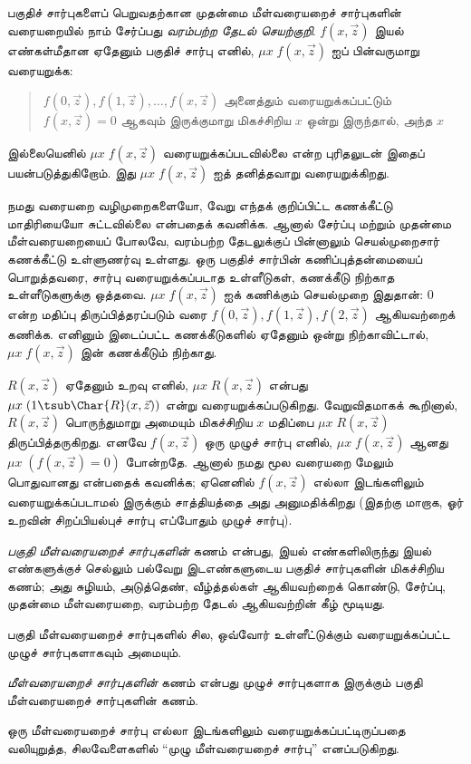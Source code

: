 \documentclass[../../../include/open-logic-section]{subfiles}
\begin{document}
பகுதிச் சார்புகளைப் பெறுவதற்கான முதன்மை மீள்வரையறைச் சார்புகளின்
வரையறையில் நாம் சேர்ப்பது \emph{வரம்பற்ற தேடல் செயற்குறி}.
$f(x,\vec z)$ இயல் எண்கள்மீதான ஏதேனும் பகுதிச் சார்பு எனில்,
$\mu x \; f(x,\vec z)$ ஐப் பின்வருமாறு வரையறுக்க:
\begin{quote}
  $f(0,\vec z), f(1,\vec z), \dots, f(x,\vec z)$ அனைத்தும்
  வரையறுக்கப்பட்டும் $f(x,\vec z) = 0$ ஆகவும் இருக்குமாறு
  மிகச்சிறிய $x$ ஒன்று இருந்தால், அந்த $x$
\end{quote}
இல்லையெனில் $\mu x \; f(x,\vec z)$ வரையறுக்கப்படவில்லை என்ற
புரிதலுடன் இதைப் பயன்படுத்துகிறோம். இது $\mu x \; f(x,\vec z)$ ஐத்
தனித்தவாறு வரையறுக்கிறது.

\begin{explain}
நமது வரையறை வழிமுறைகளையோ,
வேறு எந்தக் குறிப்பிட்ட கணக்கீட்டு மாதிரியையோ சுட்டவில்லை என்பதைக்
கவனிக்க. ஆனால் சேர்ப்பு மற்றும் முதன்மை மீள்வரையறையைப் போலவே,
வரம்பற்ற தேடலுக்குப் பின்னாலும் செயல்முறைசார் கணக்கீட்டு உள்ளுணர்வு
உள்ளது. ஒரு பகுதிச் சார்பின் கணிப்புத்தன்மையைப் பொறுத்தவரை, சார்பு
வரையறுக்கப்படாத உள்ளீடுகள், கணக்கீடு நிற்காத உள்ளீடுகளுக்கு ஒத்தவை.
$\mu x \; f(x,\vec z)$ ஐக் கணிக்கும் செயல்முறை இதுதான்:
0 என்ற மதிப்பு திருப்பித்தரப்படும் வரை $f(0,\vec z), f(1,\vec z),
f(2,\vec z)$ ஆகியவற்றைக் கணிக்க. எனினும் இடைப்பட்ட கணக்கீடுகளில்
ஏதேனும் ஒன்று நிற்காவிட்டால், $\mu x \; f(x,\vec z)$ இன் கணக்கீடும்
நிற்காது.
\end{explain}

$R(x,\vec z)$ ஏதேனும் உறவு எனில், $\mu x \; R(x,\vec z)$ என்பது
$\mu x \; (1 \tsub \Char{R}(x,\vec z))$ என்று வரையறுக்கப்படுகிறது.
வேறுவிதமாகக் கூறினால், $R(x,\vec z)$ பொருந்துமாறு அமையும் மிகச்சிறிய
$x$ மதிப்பை $\mu x \; R(x,\vec z)$ திருப்பித்தருகிறது. எனவே
$f(x,\vec z)$ ஒரு முழுச் சார்பு எனில், $\mu x \; f(x,\vec z)$ ஆனது
$\mu x \; (f(x,\vec z) = 0)$ போன்றதே. ஆனால் நமது மூல வரையறை
மேலும் பொதுவானது என்பதைக் கவனிக்க; ஏனெனில் $f(x,\vec z)$ எல்லா
இடங்களிலும் வரையறுக்கப்படாமல் இருக்கும் சாத்தியத்தை அது அனுமதிக்கிறது
(இதற்கு மாறாக, ஓர் உறவின் சிறப்பியல்புச் சார்பு எப்போதும் முழுச் சார்பு).

\begin{defn}
\emph{பகுதி மீள்வரையறைச் சார்புகளின்} கணம் என்பது, இயல்
எண்களிலிருந்து இயல் எண்களுக்குச் செல்லும் பல்வேறு இடஎண்களுடைய
பகுதிச் சார்புகளின் மிகச்சிறிய கணம்; அது சுழியம், அடுத்தெண்,
வீழ்த்தல்கள் ஆகியவற்றைக் கொண்டு, சேர்ப்பு, முதன்மை மீள்வரையறை,
வரம்பற்ற தேடல் ஆகியவற்றின் கீழ் மூடியது.
\end{defn}

பகுதி மீள்வரையறைச் சார்புகளில் சில, ஒவ்வோர் உள்ளீட்டுக்கும்
வரையறுக்கப்பட்ட முழுச் சார்புகளாகவும் அமையும்.

\begin{defn}
\emph{மீள்வரையறைச் சார்புகளின்} கணம் என்பது முழுச் சார்புகளாக
இருக்கும் பகுதி மீள்வரையறைச் சார்புகளின் கணம்.
\end{defn}

ஒரு மீள்வரையறைச் சார்பு எல்லா இடங்களிலும் வரையறுக்கப்பட்டிருப்பதை
வலியுறுத்த, சிலவேளைகளில் “முழு மீள்வரையறைச் சார்பு” எனப்படுகிறது.
\end{document}
